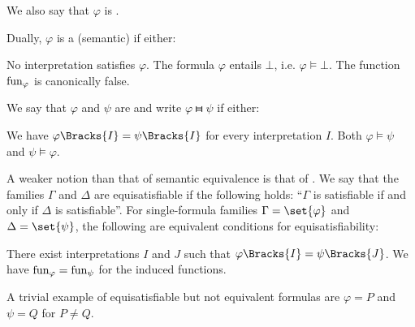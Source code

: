 \begin{definition}
\begin{thmenum}
    We also say that \( \varphi \) is .

     Dually, \( \varphi \) is a (semantic)  if either:
    \begin{itemize}
       No interpretation satisfies \( \varphi \).
       The formula \( \varphi \) entails \( \bot \), i.e. \( \varphi \vDash \bot \).
       The function \( \operatorname{fun}_\varphi \) is canonically false.
    \end{itemize}

     We say that \( \varphi \) and \( \psi \) are  and write \( \varphi \gleichstark \psi \) if either:
    \begin{itemize}
       We have \( \varphi\Bracks{I} = \psi\Bracks{I} \) for every interpretation \( I \).
       Both \( \varphi \vDash \psi \) and \( \psi \vDash \varphi \).
    \end{itemize}

     A weaker notion than that of semantic equivalence is that of . We say that the families \( \Gamma \) and \( \Delta \) are equisatisfiable if the following holds: \enquote{\( \Gamma \) is satisfiable if and only if \( \Delta \) is satisfiable}. For single-formula families \( \Gamma = \set{ \varphi } \) and \( \Delta = \set{ \psi } \), the following are equivalent conditions for equisatisfiability:
    \begin{itemize}
       There exist interpretations \( I \) and \( J \) such that \( \varphi\Bracks{I} = \psi\Bracks{J} \).
       We have \( \operatorname{fun}_\varphi = \operatorname{fun}_\psi \) for the induced functions.
    \end{itemize}

    A trivial example of equisatisfiable but not equivalent formulas are \( \varphi = P \) and \( \psi = Q \) for \( P \neq Q \).
  \end{thmenum}
\end{definition}


